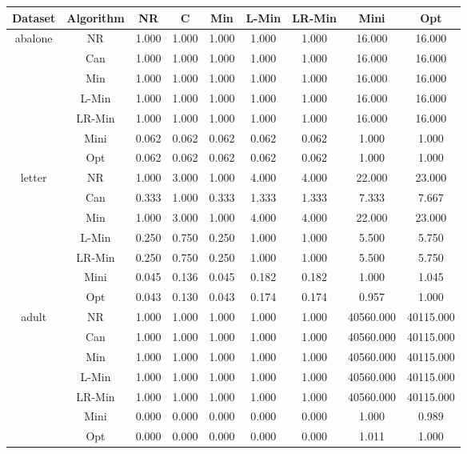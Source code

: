 \documentclass[11pt]{book}
\begin{document}
\begin{table}

	\centering
	
\begin{tabular}{|c|c|c|c|c|c|c|c|c|}

    \hline
    Dataset &
    	Algorithm &
    	NR &
    	C &
    	Min &
    	L-Min &
    	LR-Min &
    	Mini &
    	Opt \\
    	    
    \hline
    \multirow{5}{*}{abalone}
    	& NR         & 1.000 & 1.000 & 1.000 & 1.000 & 1.000 & 16.000 & 16.000 \\
    	& Can        & 1.000 & 1.000 & 1.000 & 1.000 & 1.000 & 16.000 & 16.000 \\
    	& Min        & 1.000 & 1.000 & 1.000 & 1.000 & 1.000 & 16.000 & 16.000 \\
    	& L-Min      & 1.000 & 1.000 & 1.000 & 1.000 & 1.000 & 16.000 & 16.000 \\
    	& LR-Min     & 1.000 & 1.000 & 1.000 & 1.000 & 1.000 & 16.000 & 16.000 \\	
    	& Mini       & 0.062 & 0.062 & 0.062 & 0.062 & 0.062 & 1.000 & 1.000 \\	
    	& Opt        & 0.062 & 0.062 & 0.062 & 0.062 & 0.062 & 1.000 & 1.000 \\
    	
    \hline
    \multirow{5}{*}{letter}
    	& NR         & 1.000 & 3.000 & 1.000 & 4.000 & 4.000 & 22.000 & 23.000 \\
    	& Can        & 0.333 & 1.000 & 0.333 & 1.333 & 1.333 & 7.333 & 7.667 \\
    	& Min        & 1.000 & 3.000 & 1.000 & 4.000 & 4.000 & 22.000 & 23.000 \\
    	& L-Min      & 0.250 & 0.750 & 0.250 & 1.000 & 1.000 & 5.500 & 5.750 \\
    	& LR-Min     & 0.250 & 0.750 & 0.250 & 1.000 & 1.000 & 5.500 & 5.750 \\	
    	& Mini       & 0.045 & 0.136 & 0.045 & 0.182 & 0.182 & 1.000 & 1.045 \\	
    	& Opt        & 0.043 & 0.130 & 0.043 & 0.174 & 0.174 & 0.957 & 1.000 \\
	
    \hline
    \multirow{5}{*}{adult}
    	& NR         & 1.000 & 1.000 & 1.000 & 1.000 & 1.000 & 40560.000 & 40115.000 \\
    	& Can        & 1.000 & 1.000 & 1.000 & 1.000 & 1.000 & 40560.000 & 40115.000 \\
    	& Min        & 1.000 & 1.000 & 1.000 & 1.000 & 1.000 & 40560.000 & 40115.000 \\
    	& L-Min      & 1.000 & 1.000 & 1.000 & 1.000 & 1.000 & 40560.000 & 40115.000 \\
    	& LR-Min     & 1.000 & 1.000 & 1.000 & 1.000 & 1.000 & 40560.000 & 40115.000 \\	
    	& Mini       & 0.000 & 0.000 & 0.000 & 0.000 & 0.000 & 1.000 & 0.989 \\	
    	& Opt        & 0.000 & 0.000 & 0.000 & 0.000 & 0.000 & 1.011 & 1.000 \\
    	

\end{tabular}
\end{table}
\end{document}
